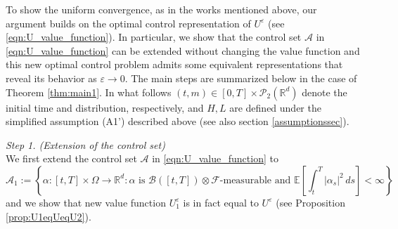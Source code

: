 \documentclass[reqno,11pt]{amsart}
\numberwithin{equation}{section}
\newcommand{\R}{\mathbb{R}} %
\newcommand{\e}{\varepsilon}
\newcommand{\nd}{\noindent}
\begin{document}
    \nd
    To show the uniform convergence, as in the works \cite{MitakeTranYu2019,TranYu2021} mentioned above, our argument builds on the optimal control representation of $U^\varepsilon$ (see \eqref{eqn:U_value_function}). In particular, we show that the control set $\mathcal{A}$ in \eqref{eqn:U_value_function} can be extended without changing the value function and this new optimal control problem admits some equivalent representations that reveal its behavior as $\e \to 0$. The main steps are summarized below in the case of Theorem \ref{thm:main1}. In what follows $(t,m)\in [0,T]\times\mathcal{P}_2(\R^d)$ denote the initial time and distribution, respectively, and $H,L$ are defined under the simplified assumption (A1') described above (see also section \ref{assumptionssec}).
    \vspace{3mm}

    \nd
    \textit{Step 1. (Extension of the control set)}\\
    We first extend the control set $\mathcal{A}$ in \eqref{eqn:U_value_function} to
    \[
    \mathcal{A}_1:=\left\{\alpha:[t,T]\times \Omega\rightarrow \mathbb{R}^d: \alpha \text{ is } \mathcal{B}([t,T])\otimes \mathcal{F} \text{-measurable and } \mathbb{E}\left[ \int_t^T|\alpha_s|^2 \,ds \right] <\infty\right\}\]
    and we show that new value function $U^\e_1$ is in fact equal to $U^\e$ (see Proposition \ref{prop:U1eqUeqU2}).
    \vspace{2mm}
\end{document}
